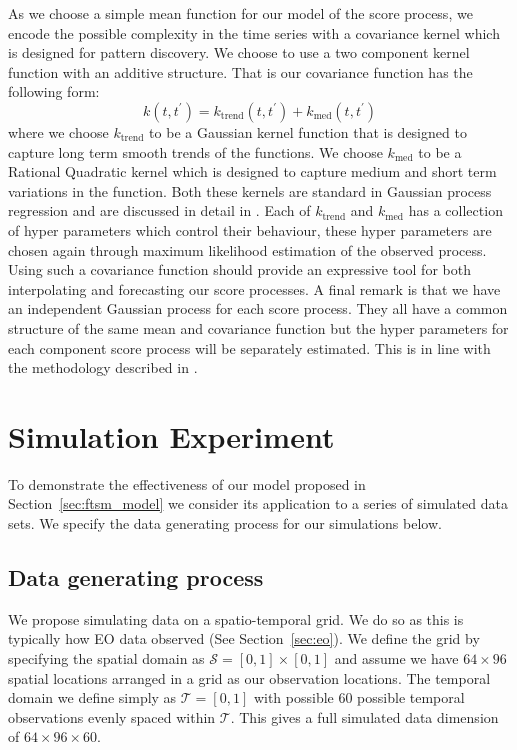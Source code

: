 As we choose a simple mean function for our model of the score process, we encode the possible complexity in the time series with a covariance kernel which is designed for pattern discovery. 
We choose to use a two component kernel function with an additive structure. 
That is our covariance function has the following form:
\begin{equation}
	k(t, t^\prime) = k_\text{trend}(t, t^\prime) + k_\text{med}(t, t^\prime)
\end{equation}
where we choose $k_{\text{trend}}$ to be a Gaussian kernel function that is designed to capture long term smooth trends of the functions.
We choose $k_{\text{med}}$ to be a Rational Quadratic kernel which is designed to capture medium and short term variations in the function.
Both these kernels are standard in Gaussian process regression and are discussed in detail in \citep{williams_gaussian_2006}. 
Each of $k_{\text{trend}}$ and $k_{\text{med}}$ has a collection of hyper parameters which control their behaviour, these hyper parameters are chosen again through maximum likelihood estimation of the observed process.
Using such a covariance function should provide an expressive tool for both interpolating and forecasting our score processes.
A final remark is that we have an independent Gaussian process for each score process.
They all have a common structure of the same mean and covariance function but the hyper parameters for each component score process will be separately estimated.
This is in line with the methodology described in \citep{hyndman_forecasting_2009}. 

\section{Simulation Experiment \label{sec:ftsm_sim}}
To demonstrate the effectiveness of our model proposed in Section~\ref{sec:ftsm_model} we consider its application to a series of simulated data sets.
We specify the data generating process for our simulations below. 

\subsection{Data generating process \label{ftsm_sim_dgp}}
We propose simulating data on a spatio-temporal grid.
We do so as this is typically how EO data observed (See Section~\ref{sec:eo}).
We define the grid by specifying the spatial domain as $\mathcal{S} = \left[0, 1\right] \times \left[0, 1\right]$ and assume we have $64 \times 96$ spatial locations arranged in a grid as our observation locations.
The temporal domain we define simply as $\mathcal{T} = \left[0, 1\right]$ with possible $60$ possible temporal observations evenly spaced within $\mathcal{T}$. 
This gives a full simulated data dimension of $64 \times 96 \times 60$. 

